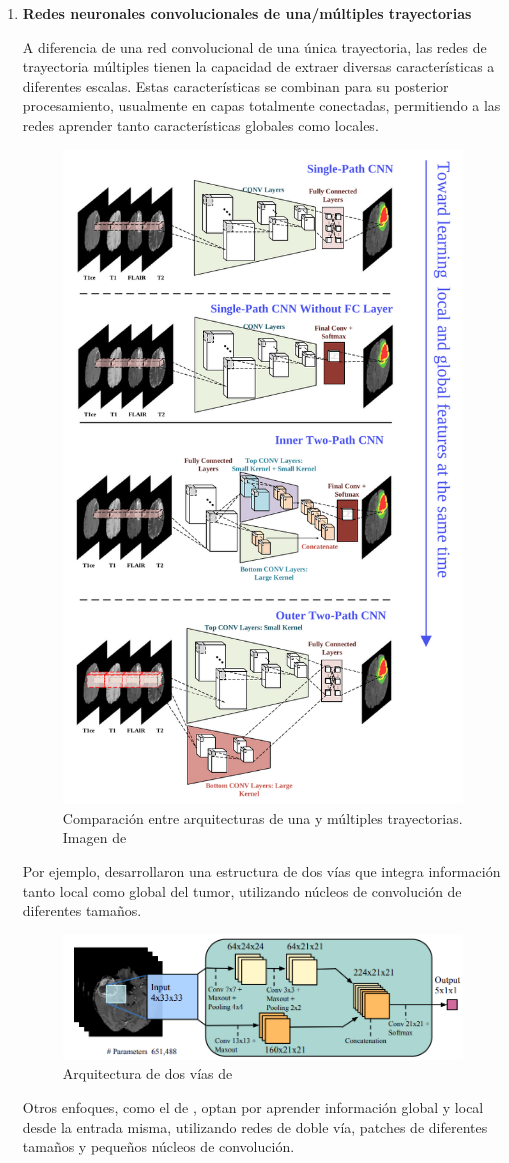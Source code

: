 			\begin{enumerate}
					
				\item \textbf{Redes neuronales convolucionales de una/múltiples trayectorias}
					
				A diferencia de una red convolucional de una única trayectoria, las redes de trayectoria múltiples tienen la capacidad de extraer diversas características a diferentes escalas. Estas características se combinan para su posterior procesamiento, usualmente en capas totalmente conectadas, permitiendo a las redes aprender tanto características globales como locales. 
				
				\begin{figure}[H]
					\centering
					\includegraphics[width=0.27\linewidth]{imagenes/comparisonsinglemultipleCNN.png}
					\caption{Comparación entre arquitecturas de una y múltiples trayectorias. Imagen de \cite{liu2023deep}}
				\end{figure}
				
				Por ejemplo, \cite{havaei2017brain} desarrollaron una estructura de dos vías que integra información tanto local como global del tumor, utilizando núcleos de convolución de diferentes tamaños.
				
				\begin{figure}[H]
					\centering
					\includegraphics[width=0.75\linewidth]{imagenes/havaei2017architecture.png}
					\caption{Arquitectura de dos vías de \cite{havaei2017brain}}
				\end{figure}

				Otros enfoques, como el de \cite{kamnitsas2017efficient}, optan por aprender información global y local desde la entrada misma, utilizando redes de doble vía, patches de diferentes tamaños y pequeños núcleos de convolución. 
				

\end{enumerate}
